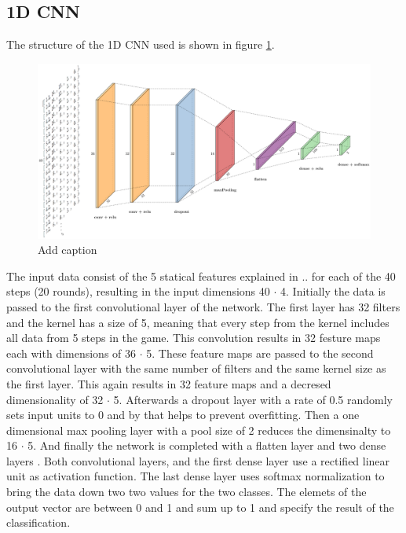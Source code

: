 \subsection{1D CNN}
The structure of the 1D CNN used is shown in figure \ref{fig:1dCnnStructure}.
\begin{figure}[H]
	\centering
	\includegraphics[width=15cm]{images/1dCnnStructure.png}
	\caption[Bild kurz]{Add caption}
	\label{fig:1dCnnStructure}
\end{figure}
The input data consist of the 5 statical features explained in ..  for each of the 40 steps (20 rounds), resulting in the input dimensions 40 $\cdot$ 4. Initially the data is passed to the first convolutional layer of the network. The first layer has 32 filters and the kernel has a size of 5, meaning that every step from the kernel includes all data from 5 steps in the game. This convolution results in 32 festure maps each with dimensions of 36 $\cdot$ 5. These feature maps are passed to the second convolutional layer with the same number of filters and the same kernel size as the first layer. This again results in 32 feature maps and a decresed dimensionality of 32 $\cdot$ 5. Afterwards a dropout layer with a rate of 0.5 randomly sets input units to 0 and by that helps to prevent overfitting. Then a one dimensional max pooling layer with a pool size of 2 reduces the dimensinalty to 16 $\cdot$ 5.  And finally the network is completed with a flatten layer and two dense layers . Both convolutional layers, and the first dense layer use a rectified linear unit as activation function. The last dense layer uses softmax normalization to bring the data down two two values for the two classes. The elemets of the output vector are between 0 and 1 and sum up to 1 and specify the result of the classification.  

